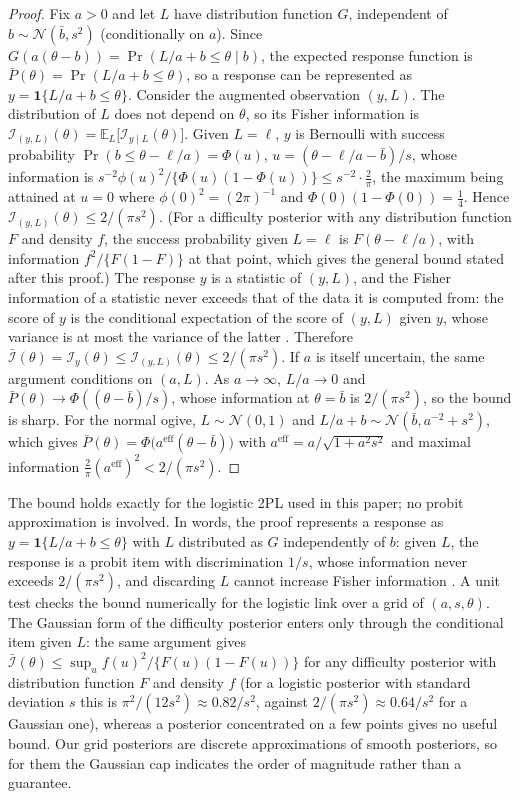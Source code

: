 \begin{proof}
Fix $a>0$ and let $L$ have distribution function $G$, independent of
$b\sim\mathcal N(\bar b,s^2)$ (conditionally on $a$). Since
$G(a(\theta-b))=\Pr(L/a+b\le\theta\mid b)$, the expected response function is
$\bar P(\theta)=\Pr(L/a+b\le\theta)$, so a response can be represented as
$y=\mathbf 1\{L/a+b\le\theta\}$. Consider the augmented observation $(y,L)$. The
distribution of $L$ does not depend on $\theta$, so its Fisher information is
$\mathcal I_{(y,L)}(\theta)=\mathbb E_L\big[\mathcal I_{y\mid L}(\theta)\big]$. Given $L=\ell$,
$y$ is Bernoulli with success probability
$\Pr(b\le\theta-\ell/a)=\Phi(u)$, $u=(\theta-\ell/a-\bar b)/s$, whose information is
$s^{-2}\phi(u)^2/\{\Phi(u)(1-\Phi(u))\}\le s^{-2}\cdot\frac2\pi$, the maximum being
attained at $u=0$ where $\phi(0)^2=(2\pi)^{-1}$ and $\Phi(0)(1-\Phi(0))=\frac14$. Hence
$\mathcal I_{(y,L)}(\theta)\le2/(\pi s^2)$. (For a difficulty posterior with any distribution
function $F$ and density $f$, the success probability given $L=\ell$ is $F(\theta-\ell/a)$, with
information $f^2/\{F(1-F)\}$ at that point, which gives the general bound stated after this
proof.) The response $y$ is a statistic of $(y,L)$, and
the Fisher information of a statistic never exceeds that of the data it is computed from:
the score of $y$ is the conditional expectation of the score of $(y,L)$ given $y$, whose
variance is at most the variance of the latter \citep{zamir1998proof}. Therefore
$\bar{\mathcal I}(\theta)=\mathcal I_y(\theta)\le\mathcal I_{(y,L)}(\theta)\le2/(\pi s^2)$.
If $a$ is itself uncertain, the same argument conditions on $(a,L)$. As $a\to\infty$,
$L/a\to0$ and $\bar P(\theta)\to\Phi((\theta-\bar b)/s)$, whose information at
$\theta=\bar b$ is $2/(\pi s^2)$, so the bound is sharp. For the normal ogive,
$L\sim\mathcal N(0,1)$ and $L/a+b\sim\mathcal N(\bar b,a^{-2}+s^2)$, which gives
$\bar P(\theta)=\Phi\big(a^{\mathrm{eff}}(\theta-\bar b)\big)$ with
$a^{\mathrm{eff}}=a/\sqrt{1+a^2s^2}$ and maximal information $\frac2\pi(a^{\mathrm{eff}})^2<2/(\pi s^2)$.
\end{proof}

The bound holds exactly for the logistic 2PL used in this paper; no probit approximation
is involved. In words, the proof represents a response as $y=\mathbf 1\{L/a+b\le\theta\}$ with $L$
distributed as $G$ independently of $b$: given $L$, the response is a probit item with
discrimination $1/s$, whose information never exceeds $2/(\pi s^2)$, and discarding $L$
cannot increase Fisher information \citep{zamir1998proof}. A unit test checks the bound
numerically for the logistic link over a grid of $(a,s,\theta)$. The Gaussian form of the
difficulty posterior enters only through the conditional item given $L$: the same argument gives
$\bar{\mathcal I}(\theta)\le\sup_u f(u)^2/\{F(u)(1-F(u))\}$ for any difficulty posterior with
distribution function $F$ and density $f$ (for a logistic posterior with standard deviation
$s$ this is $\pi^2/(12s^2)\approx0.82/s^2$, against $2/(\pi s^2)\approx0.64/s^2$ for a Gaussian
one), whereas a posterior concentrated on a few points gives no useful bound. Our grid
posteriors are discrete approximations of smooth posteriors, so for them the Gaussian cap
indicates the order of magnitude rather than a guarantee.

